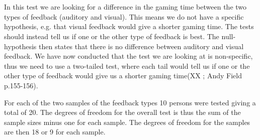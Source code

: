 \hspace{0pt} \\
\noindent{}

\noindent{}

\hspace{0pt} \\
In this test we are looking for a difference in the gaming time between the two types of feedback (auditory and visual). This means we do not have a specific hypothesis, e.g. that visual feedback would give a shorter gaming time. The tests should instead tell us if one or the other type of feedback is best. The null-hypothesis then states that there is no difference between auditory and visual feedback. We have now conducted that the test we are looking at is non-specific, thus we need to use a two-tailed test, where each tail would tell us if one or the other type of feedback would give us a shorter gaming time(XX ; Andy Field p.155-156).

For each of the two samples of the feedback types 10 persons were tested giving a total of 20. The degrees of freedom for the overall test is thus the sum of the sample sizes minus one for each sample. The degrees of freedom for the samples are then 18 or 9 for each sample.

\hspace{0pt} \\
\noindent{}

